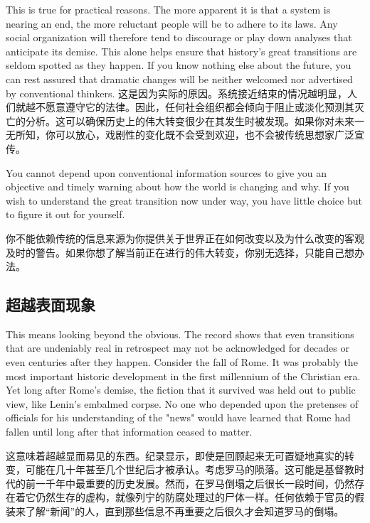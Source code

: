 \begin{Parallel}{97mm}{45mm}
  \ParallelLText
  {This is true for practical reasons. The more apparent it is that a system is nearing an end, the more reluctant people will be to adhere to its laws. Any social organization will therefore tend to discourage or play down analyses that anticipate its demise. This alone helps ensure that history's great transitions are seldom spotted as they happen. If you know nothing else about the future, you can rest assured that dramatic changes will be neither welcomed nor advertised by conventional thinkers.}
  \ParallelRText
  {这是因为实际的原因。系统接近结束的情况越明显，人们就越不愿意遵守它的法律。因此，任何社会组织都会倾向于阻止或淡化预测其灭亡的分析。这可以确保历史上的伟大转变很少在其发生时被发现。如果你对未来一无所知，你可以放心，戏剧性的变化既不会受到欢迎，也不会被传统思想家广泛宣传。}

  \ParallelPar  

  \ParallelLText
  {You cannot depend upon conventional information sources to give you an objective and timely warning about how the world is changing and why. If you wish to understand the great transition now under way, you have little choice but to figure it out for yourself. }
  
  \ParallelRText
  {你不能依赖传统的信息来源为你提供关于世界正在如何改变以及为什么改变的客观及时的警告。如果你想了解当前正在进行的伟大转变，你别无选择，只能自己想办法。}

  \ParallelPar  

  \subsection{超越表面现象}

  \ParallelLText
  {This means looking beyond the obvious. The record shows that even transitions that are undeniably real in retrospect may not be acknowledged for decades or even centuries after they happen. Consider the fall of Rome. It was probably the most important historic development in the first millennium of the Christian era. Yet long after Rome's demise, the fiction that it survived was held out to public view, like Lenin's embalmed corpse. No one who depended upon the pretenses of officials for his understanding of the "news" would have learned that Rome had fallen until long after that information ceased to matter.} 

  \ParallelRText
  {这意味着超越显而易见的东西。纪录显示，即使是回顾起来无可置疑地真实的转变，可能在几十年甚至几个世纪后才被承认。考虑罗马的陨落。这可能是基督教时代的前一千年中最重要的历史发展。然而，在罗马倒塌之后很长一段时间，仍然存在着它仍然生存的虚构，就像列宁的防腐处理过的尸体一样。任何依赖于官员的假装来了解“新闻”的人，直到那些信息不再重要之后很久才会知道罗马的倒塌。}
  \ParallelPar


\end{Parallel}
